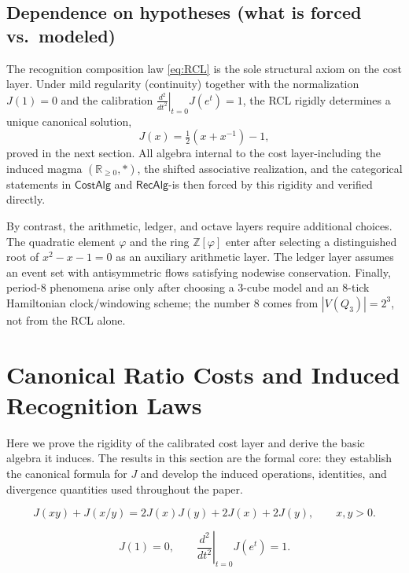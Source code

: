 \documentclass[11pt,reqno]{amsart}
\theoremstyle{plain}
\theoremstyle{definition}
\theoremstyle{remark}
\newcommand{\phig}{\varphi}
\newcommand{\Jcost}{J}
\newcommand{\RR}{\mathbb{R}}
\newcommand{\ZZ}{\mathbb{Z}}
\newcommand{\1}{\mathbf{1}}
\begin{document}
\subsection*{Dependence on hypotheses (what is forced vs.\ modeled)}\label{subsec:dependence}
The recognition composition law \eqref{eq:RCL} is the sole structural axiom on the cost layer.
Under mild regularity (continuity) together with the normalization $J(1)=0$ and the calibration
$\left.\frac{d^2}{dt^2}\right|_{t=0}J(e^t)=1$, the RCL rigidly determines a unique canonical solution,
\[
J(x)=\tfrac12(x+x^{-1})-1,
\]
proved in the next section.
All algebra internal to the cost layer-including the induced magma $(\RR_{\ge0},\ast)$, the shifted associative realization, and the categorical statements in $\mathsf{CostAlg}$ and $\mathsf{RecAlg}$-is then forced by this rigidity and verified directly.

By contrast, the arithmetic, ledger, and octave layers require additional choices.
The quadratic element $\phig$ and the ring $\ZZ[\phig]$ enter after selecting a distinguished root of $x^2-x-1=0$ as an auxiliary arithmetic layer.
The ledger layer assumes an event set with antisymmetric flows satisfying nodewise conservation.
Finally, period-$8$ phenomena arise only after choosing a $3$-cube model and an $8$-tick Hamiltonian clock/windowing scheme; the number $8$ comes from $|V(Q_3)|=2^3$, not from the RCL alone.

\section{Canonical Ratio Costs and Induced Recognition Laws}\label{sec:cost}
Here we prove the rigidity of the calibrated cost layer and derive the basic algebra it induces. The results in this section are the formal core: they establish the canonical formula for $J$ and develop the induced operations, identities, and divergence quantities used throughout the paper.

\begin{equation}\label{eq:RCL}
\Jcost(xy)+\Jcost(x/y)=2\Jcost(x)\Jcost(y)+2\Jcost(x)+2\Jcost(y), \qquad x,y>0.
\end{equation}


\begin{equation}\label{eq:norm-calib}
\Jcost(1)=0,\qquad \left.\frac{d^2}{dt^2}\right|_{t=0}\Jcost(e^t)=1.
\end{equation}
\end{document}
